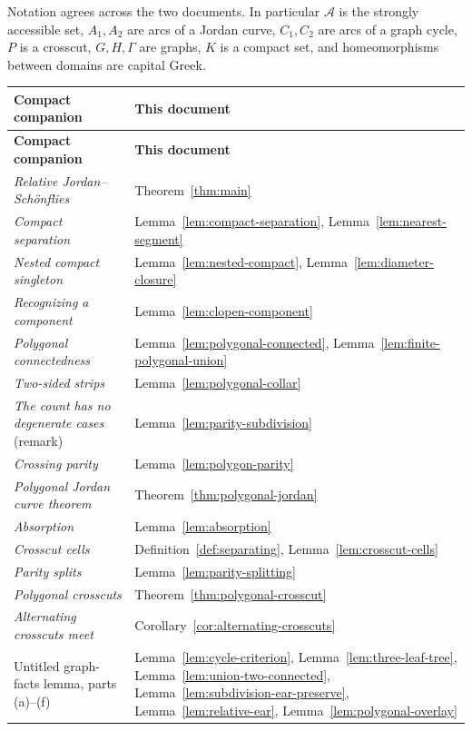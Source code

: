 \documentclass[11pt]{article}
\theoremstyle{mainplain}
\theoremstyle{mainroman}
\theoremstyle{definition}
\numberwithin{equation}{section}
\begin{document}
Notation agrees across the two documents. In particular $\mathcal A$ is
the strongly accessible set, $A_1,A_2$ are arcs of a Jordan curve,
$C_1,C_2$ are arcs of a graph cycle, $P$ is a crosscut, $G,H,\Gamma$
are graphs, $K$ is a compact set, and homeomorphisms between domains
are capital Greek.

\begin{longtable}{@{}p{}p{}@{}}
\textbf{Compact companion} & \textbf{This document}\\
\hline
\endfirsthead
\textbf{Compact companion} & \textbf{This document}\\
\hline
\endhead
\emph{Relative Jordan--Schönflies} & Theorem~\ref{thm:main} \\
\emph{Compact separation} & Lemma~\ref{lem:compact-separation}, Lemma~\ref{lem:nearest-segment} \\
\emph{Nested compact singleton} & Lemma~\ref{lem:nested-compact}, Lemma~\ref{lem:diameter-closure} \\
\emph{Recognizing a component} & Lemma~\ref{lem:clopen-component} \\
\emph{Polygonal connectedness} & Lemma~\ref{lem:polygonal-connected}, Lemma~\ref{lem:finite-polygonal-union} \\
\emph{Two-sided strips} & Lemma~\ref{lem:polygonal-collar} \\
\emph{The count has no degenerate cases} (remark) & Lemma~\ref{lem:parity-subdivision} \\
\emph{Crossing parity} & Lemma~\ref{lem:polygon-parity} \\
\emph{Polygonal Jordan curve theorem} & Theorem~\ref{thm:polygonal-jordan} \\
\emph{Absorption} & Lemma~\ref{lem:absorption} \\
\emph{Crosscut cells} & Definition~\ref{def:separating}, Lemma~\ref{lem:crosscut-cells} \\
\emph{Parity splits} & Lemma~\ref{lem:parity-splitting} \\
\emph{Polygonal crosscuts} & Theorem~\ref{thm:polygonal-crosscut} \\
\emph{Alternating crosscuts meet} & Corollary~\ref{cor:alternating-crosscuts} \\
Untitled graph-facts lemma, parts (a)--(f) & Lemma~\ref{lem:cycle-criterion}, Lemma~\ref{lem:three-leaf-tree}, Lemma~\ref{lem:union-two-connected}, Lemma~\ref{lem:subdivision-ear-preserve}, Lemma~\ref{lem:relative-ear}, Lemma~\ref{lem:polygonal-overlay} \\

\end{longtable}
\end{document}
